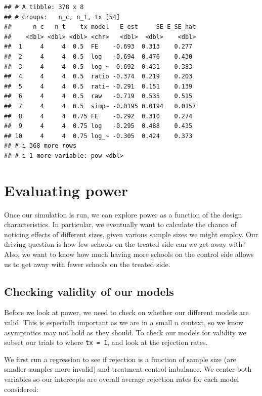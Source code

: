 \documentclass[
]{book}
\begin{document}
\begin{verbatim}
## # A tibble: 378 x 8
## # Groups:   n_c, n_t, tx [54]
##      n_c   n_t    tx model   E_est     SE E_SE_hat
##    <dbl> <dbl> <dbl> <chr>   <dbl>  <dbl>    <dbl>
##  1     4     4  0.5  FE    -0.693  0.313    0.277 
##  2     4     4  0.5  log   -0.694  0.476    0.430 
##  3     4     4  0.5  log_~ -0.692  0.431    0.383 
##  4     4     4  0.5  ratio -0.374  0.219    0.203 
##  5     4     4  0.5  rati~ -0.291  0.151    0.139 
##  6     4     4  0.5  raw   -0.719  0.535    0.515 
##  7     4     4  0.5  simp~ -0.0195 0.0194   0.0157
##  8     4     4  0.75 FE    -0.292  0.310    0.274 
##  9     4     4  0.75 log   -0.295  0.488    0.435 
## 10     4     4  0.75 log_~ -0.305  0.424    0.373 
## # i 368 more rows
## # i 1 more variable: pow <dbl>
\end{verbatim}

\section{Evaluating power}\label{evaluating-power}

Once our simulation is run, we can explore power as a function of the design characteristics.
In particular, we eventually want to calculate the chance of noticing effects of different sizes, given various sample sizes we might employ.
Our driving question is how few schools on the treated side can we get away with?
Also, we want to know how much having more schools on the control side allows us to get away with fewer schools on the treated side.

\subsection{Checking validity of our models}\label{checking-validity-of-our-models}

Before we look at power, we need to check on whether our different models are valid.
This is especiallt important as we are in a small \(n\) context, so we know asymptotics may not hold as they should.
To check our models for validity we subset our trials to where \texttt{tx\ =\ 1}, and look at the rejection rates.

We first run a regression to see if rejection is a function of sample size (are smaller samples more invalid) and treatment-control imbalance.
We center both variables so our intercepts are overall average rejection rates for each model considered:
\end{document}
